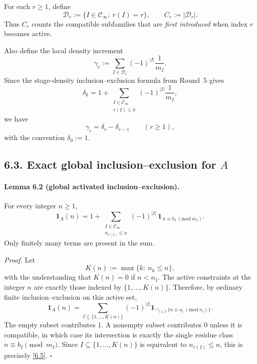 For each $r\ge 1$, define
\begin{equation}
\mathcal D_r:=\{I\in\mathcal C_\infty:\ r(I)=r\},
\qquad
C_r:=|\mathcal D_r|.
\tag{6.2}
\end{equation}
Thus $C_r$ counts the compatible subfamilies that are \emph{first introduced} when index $r$ becomes active.

Also define the local density increment
\begin{equation}
\gamma_r:=\sum_{I\in\mathcal D_r}(-1)^{|I|}\frac1{m_I}.
\tag{6.3}
\end{equation}
Since the stage-density inclusion--exclusion formula from Round~5 gives
\[
\delta_k
=
1+\sum_{\substack{I\in\mathcal C_\infty\\ r(I)\le k}}(-1)^{|I|}\frac1{m_I},
\]
we have
\begin{equation}
\gamma_r=\delta_r-\delta_{r-1}\qquad(r\ge 1),
\tag{6.4}
\end{equation}
with the convention $\delta_0:=1$.

\subsection*{6.3. Exact global inclusion--exclusion for $A$}
\paragraph{Lemma 6.2 (global activated inclusion--exclusion).}
For every integer $n\ge 1$,
\begin{equation}
\mathbf 1_A(n)
=
1+
\sum_{\substack{I\in\mathcal C_\infty\\ n_{r(I)}\le n}}
(-1)^{|I|}\,\mathbf 1_{\,n\equiv b_I\ (\mathrm{mod}\ m_I)}.
\tag{6.5}
\end{equation}
Only finitely many terms are present in the sum.

\emph{Proof.}
Let
\[
K(n):=\max\{k:\ n_k\le n\},
\]
with the understanding that $K(n)=0$ if $n<n_1$.  The active constraints at the integer $n$ are exactly those indexed by $\{1,\dots,K(n)\}$.  Therefore, by ordinary finite inclusion--exclusion on this active set,
\[
\mathbf 1_A(n)=
\sum_{I\subseteq\{1,\dots,K(n)\}}(-1)^{|I|}\mathbf 1_{\cap_{i\in I}\{n\equiv a_i\ (\mathrm{mod}\ n_i)\}}.
\]
The empty subset contributes $1$.  A nonempty subset contributes $0$ unless it is compatible, in which case its intersection is exactly the single residue class $n\equiv b_I\pmod{m_I}$.  Since $I\subseteq\{1,\dots,K(n)\}$ is equivalent to $n_{r(I)}\le n$, this is precisely \eqref{6.5}.  \hfill $\square$


